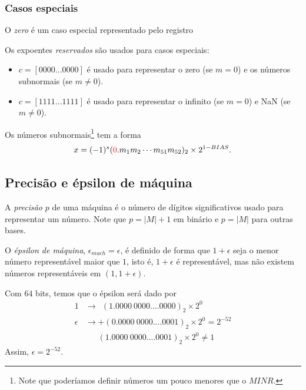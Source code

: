 \subsubsection{Casos especiais}
O \emph{zero} é um caso especial representado pelo registro
\begin{equation}
[0|\RED{000~0000~0000} |0000~0000~0000...0000~0000]
\end{equation}

Os expoentes \emph{reservados} são usados para casos especiais:
\begin{itemize}
 \item $c=[0000...0000]$ é usado para representar o zero (se $m=0$) e os números subnormais (se $m\neq 0$).
 \item $c=[1111...1111]$ é usado para representar o infinito (se $m=0$) e NaN (se $m\neq 0$).
\end{itemize}

Os números subnormais\footnote{Note que poderíamos definir números um pouco menores que o $MINR$.} tem a forma
\begin{equation}  x=(-1)^{s}({\color{red}{0}}.m_{1}m_{2}\cdots m_{51}m_{52})_2 \times 2^{1-BIAS}. \end{equation}

\subsection{Precisão e épsilon de máquina}

A \emph{precisão} $p$ de uma máquina é o número de dígitos significativos usado para representar um número. Note que $p=|M|+1$ em binário e $p=|M|$ para outras bases.

O \emph{épsilon de máquina}, $\epsilon_{mach}=\epsilon$, é definido de forma que $1+\epsilon$ seja o menor número representável maior que $1$, isto é, $1+\epsilon$ é representável, mas não existem números representáveis em $(1, 1+\epsilon)$.

\begin{ex}
  Com $64$ bits, temos que o épsilon será dado por
\begin{equation}
  \begin{split}
  1      &\rightarrow ~~(1.0000~0000....0000)_2\times 2^{0} \\
\epsilon &\rightarrow  +(0.0000~0000....0001)_2\times 2^{0}  = 2^{-52} \\
         &      ~~~~~~~ (1.0000~0000....0001)_2\times 2^{0} \neq 1
  \end{split}
\end{equation}
Assim, $\epsilon = 2^{-52}$.
\end{ex}

